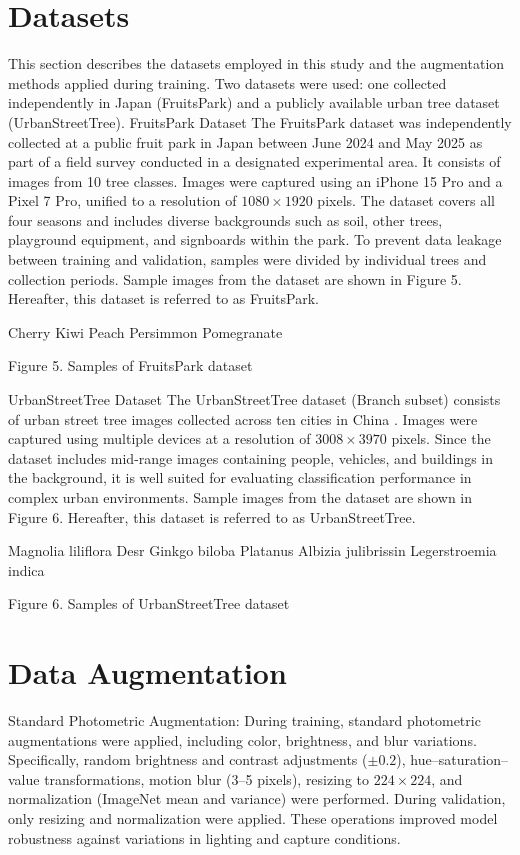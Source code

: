 \documentclass{article}
\begin{document}
\section{Datasets}
This section describes the datasets employed in this study and the augmentation methods applied during training. Two datasets were used: one collected independently in Japan (FruitsPark) and a publicly available urban tree dataset (UrbanStreetTree).
FruitsPark Dataset
The FruitsPark dataset was independently collected at a public fruit park in Japan between June 2024 and May 2025 as part of a field survey conducted in a designated experimental area. It consists of images from 10 tree classes. Images were captured using an iPhone 15 Pro and a Pixel 7 Pro, unified to a resolution of $1080 \times 1920$ pixels. The dataset covers all four seasons and includes diverse backgrounds such as soil, other trees, playground equipment, and signboards within the park. To prevent data leakage between training and validation, samples were divided by individual trees and collection periods. Sample images from the dataset are shown in Figure 5. Hereafter, this dataset is referred to as FruitsPark.

Cherry	Kiwi	Peach	Persimmon	Pomegranate

Figure 5. Samples of FruitsPark dataset

UrbanStreetTree Dataset
The UrbanStreetTree dataset (Branch subset) consists of urban street tree images collected across ten cities in China \cite{ref11}. Images were captured using multiple devices at a resolution of $3008 \times 3970$ pixels. Since the dataset includes mid-range images containing people, vehicles, and buildings in the background, it is well suited for evaluating classification performance in complex urban environments. Sample images from the dataset are shown in Figure 6. Hereafter, this dataset is referred to as UrbanStreetTree.

Magnolia liliflora Desr	Ginkgo biloba	Platanus	Albizia julibrissin	Legerstroemia indica

Figure 6. Samples of UrbanStreetTree dataset \cite{ref11}

\section{Data Augmentation}
Standard Photometric Augmentation:
During training, standard photometric augmentations were applied, including color, brightness, and blur variations. Specifically, random brightness and contrast adjustments ($\pm 0.2$), hue–saturation–value transformations, motion blur (3–5 pixels), resizing to $224 \times 224$, and normalization (ImageNet mean and variance) were performed. During validation, only resizing and normalization were applied. These operations improved model robustness against variations in lighting and capture conditions.
\end{document}

